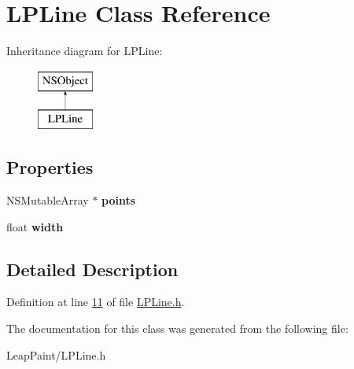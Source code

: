 \hypertarget{interface_l_p_line}{\section{L\-P\-Line Class Reference}
\label{df/dbc/interface_l_p_line}
}
Inheritance diagram for L\-P\-Line\-:\begin{figure}[H]
\begin{center}
\leavevmode
\includegraphics[height=2.000000cm]{df/dbc/interface_l_p_line}
\end{center}
\end{figure}
\subsection*{Properties}
\begin{DoxyCompactItemize}
\item 
\hypertarget{interface_l_p_line_a3f5edffc9c461de1a0cbda01de250bd2}{N\-S\-Mutable\-Array $\ast$ {\bfseries points}}\label{df/dbc/interface_l_p_line_a3f5edffc9c461de1a0cbda01de250bd2}

\item 
\hypertarget{interface_l_p_line_a4d06bc7cac330ed07213cb50229313fd}{float {\bfseries width}}\label{df/dbc/interface_l_p_line_a4d06bc7cac330ed07213cb50229313fd}

\end{DoxyCompactItemize}


\subsection{Detailed Description}


Definition at line \hyperlink{_l_p_line_8h_source_l00011}{11} of file \hyperlink{_l_p_line_8h_source}{L\-P\-Line.\-h}.



The documentation for this class was generated from the following file\-:\begin{DoxyCompactItemize}
\item 
Leap\-Paint/L\-P\-Line.\-h\end{DoxyCompactItemize}
